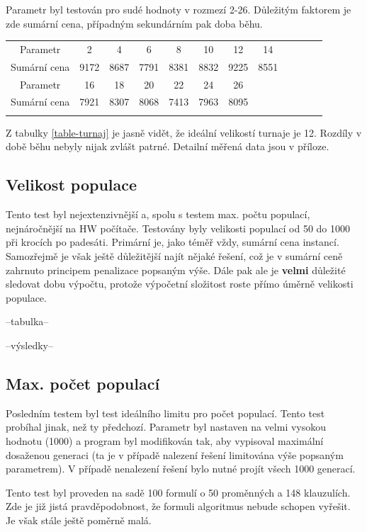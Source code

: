 \documentclass[a4paper]{article}
\begin{document}
		Parametr byl testován pro sudé hodnoty v rozmezí 2-26. Důležitým faktorem je zde sumární cena, případným sekundárním pak doba běhu.
		
		\begin{tabular}{cccccccccccc} \label{table-turnaj}
			\\
			Parametr & 2 & 4 & 6 & 8 & 10 & 12 & 14\\
			Sumární cena & 9172 & 8687 & 7791 & 8381 & 8832 & 9225 & 8551\\
			\hline
			Parametr & 16 & 18 & 20 & 22 & 24 & 26 \\
			Sumární cena & 7921 & 8307 & 8068 & 7413 & 7963 & 8095\\
			\\
			\end{tabular}
		
		Z tabulky \ref{table-turnaj} je jasně vidět, že ideální velikostí turnaje je 12. Rozdíly v době běhu nebyly nijak zvlášt patrné. Detailní měřená data jsou v příloze.
	
	\subsection{Velikost populace}
		Tento test byl nejextenzivnější a, spolu s testem max. počtu populací, nejnáročnější na HW počítače. Testovány byly velikosti populací od 50 do 1000 při krocích po padesáti. Primární je, jako téměř vždy, sumární cena instancí. Samozřejmě je však ještě důležitější najít nějaké řešení, což je v sumární ceně zahrnuto principem penalizace popsaným výše. Dále pak ale je \textbf{velmi} důležité sledovat dobu výpočtu, protože výpočetní složitost roste přímo úměrně velikosti populace.
		
		--tabulka--
		
		--výsledky--
	
	\subsection{Max. počet populací}
		Posledním testem byl test ideálního limitu pro počet populací. Tento test probíhal jinak, než ty předchozí. Parametr byl nastaven na velmi vysokou hodnotu (1000) a program byl modifikován tak, aby vypisoval maximální dosaženou generaci (ta je v případě nalezení řešení limitována výše popsaným parametrem). V případě nenalezení řešení bylo nutné projít všech 1000 generací.	
		
		Tento test byl proveden na sadě 100 formulí o 50 proměnných a 148 klauzulích. Zde je již jistá pravděpodobnost, že formuli algoritmus nebude schopen vyřešit. Je však stále ještě poměrně malá.
		
\end{document}
